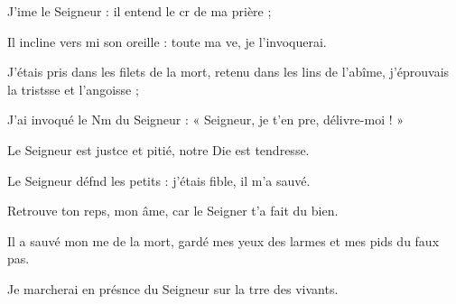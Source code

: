 \item J’ime le Seigneur :\psstar{} il entend le cr de ma prière ;
\item Il incline vers mi son oreille :\psstar{} toute ma ve, je l’invoquerai.
\item J’étais pris dans les filets de la mort,\pscross{} retenu dans les lins de l’abîme,\psstar{} j’éprouvais la tristsse et l’angoisse ;
\item J’ai invoqué le Nm du Seigneur :\psstar{} « Seigneur, je t’en pre, délivre-moi ! »
\item Le Seigneur est justce et pitié,\psstar{} notre Die est tendresse.
\item Le Seigneur défnd les petits :\psstar{} j’étais fible, il m’a sauvé.
\item Retrouve ton reps, mon âme,\psstar{} car le Seigner t’a fait du bien.
\item Il a sauvé mon me de la mort,\psstar{} gardé mes yeux des larmes et mes pids du faux pas.
\item Je marcherai en présnce du Seigneur\psstar{} sur la trre des vivants.